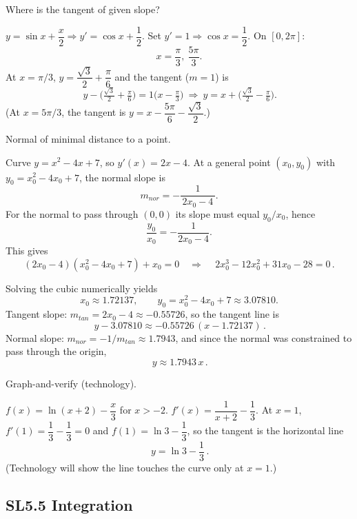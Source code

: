 \documentclass[11pt]{article}
\def\textbf#1{#1}%
\def\mathrm#1{#1}%
\newcommand{\tocsubsection}[1]{\subsection{#1}}
\begin{document}
\begin{solution}
\textbf{Where is the tangent of given slope?}

$y=\sin x+\dfrac{x}{2}\Rightarrow y'=\cos x+\dfrac12$.  
Set $y'=1\Rightarrow \cos x=\dfrac12$. On $[0,2\pi]$:
\[
\boxed{x=\frac{\pi}{3},\ \frac{5\pi}{3}}.
\]
At $x=\pi/3$, $y=\dfrac{\sqrt{3}}{2}+\dfrac{\pi}{6}$ and the tangent ($m=1$) is
\[
\boxed{\,y-\Big(\tfrac{\sqrt{3}}{2}+\tfrac{\pi}{6}\Big)=1\Big(x-\tfrac{\pi}{3}\Big)\ \Rightarrow\
y=x+\Big(\tfrac{\sqrt{3}}{2}-\tfrac{\pi}{6}\Big).}
\]
(At $x=5\pi/3$, the tangent is $y=x-\dfrac{5\pi}{6}-\dfrac{\sqrt{3}}{2}$.)
\end{solution}

\begin{solution}
\textbf{Normal of minimal distance to a point.}

Curve $y=x^2-4x+7$, so $y'(x)=2x-4$.  
At a general point $(x_0,y_0)$ with $y_0=x_0^2-4x_0+7$, the normal slope is
\[
m_{\mathrm{nor}}=-\frac{1}{\,2x_0-4\,}.
\]
For the normal to pass through $(0,0)$ its slope must equal $y_0/x_0$, hence
\[
\frac{y_0}{x_0}=-\frac{1}{2x_0-4}.
\]
This gives
\[
(2x_0-4)(x_0^2-4x_0+7)+x_0=0
\quad\Rightarrow\quad
\boxed{\,2x_0^3-12x_0^2+31x_0-28=0\,}.
\]

Solving the cubic numerically yields
\[
\boxed{x_0\approx 1.72137},\qquad
y_0=x_0^2-4x_0+7\approx \boxed{3.07810}.
\]
Tangent slope: $m_{\mathrm{tan}}=2x_0-4\approx -0.55726$, so the tangent line is
\[
\boxed{\,y-3.07810\approx -0.55726\,(x-1.72137)\,}.
\]
Normal slope: $m_{\mathrm{nor}}=-1/m_{\mathrm{tan}}\approx 1.7943$, and since the normal was constrained to pass through the origin,
\[
\boxed{\,y\approx 1.7943\,x\,}.
\]
\end{solution}

\begin{solution}
\textbf{Graph-and-verify (technology).}

$f(x)=\ln(x+2)-\dfrac{x}{3}$ for $x>-2$.  
$f'(x)=\dfrac{1}{x+2}-\dfrac{1}{3}$.  
At $x=1$, $f'(1)=\dfrac{1}{3}-\dfrac{1}{3}=0$ and $f(1)=\ln 3-\dfrac{1}{3}$,
so the tangent is the horizontal line
\[
\boxed{\,y=\ln 3-\dfrac{1}{3}\,}.
\]
(Technology will show the line touches the curve only at $x=1$.)
\end{solution}




\tocsubsection{SL5.5 Integration}

\end{document}

